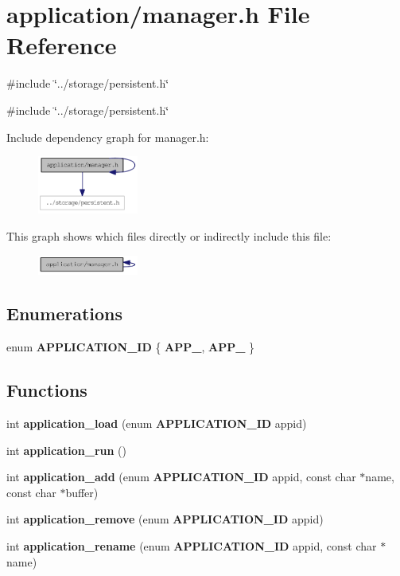 \section{application/manager.h File Reference}
\label{db/d45/manager_8h}
{\ttfamily \#include \char`\"{}../storage/persistent.h\char`\"{}}\par
{\ttfamily \#include \char`\"{}../storage/persistent.h\char`\"{}}\par
Include dependency graph for manager.h:\nopagebreak
\begin{figure}[H]
\begin{center}
\leavevmode
\includegraphics[width=94pt]{de/ddd/manager_8h__incl}
\end{center}
\end{figure}
This graph shows which files directly or indirectly include this file:\nopagebreak
\begin{figure}[H]
\begin{center}
\leavevmode
\includegraphics[width=94pt]{d4/d7e/manager_8h__dep__incl}
\end{center}
\end{figure}
\subsection*{Enumerations}
\begin{DoxyCompactItemize}
\item 
enum {\bf APPLICATION\_\-ID} \{ {\bf APP\_}, 
{\bf APP\_}
 \}
\end{DoxyCompactItemize}
\subsection*{Functions}
\begin{DoxyCompactItemize}
\item 
int {\bf application\_\-load} (enum {\bf APPLICATION\_\-ID} appid)
\item 
int {\bf application\_\-run} ()
\item 
int {\bf application\_\-add} (enum {\bf APPLICATION\_\-ID} appid, const char $\ast$name, const char $\ast$buffer)
\item 
int {\bf application\_\-remove} (enum {\bf APPLICATION\_\-ID} appid)
\item 
int {\bf application\_\-rename} (enum {\bf APPLICATION\_\-ID} appid, const char $\ast$name)
\end{DoxyCompactItemize}


